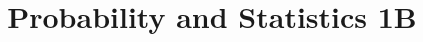 \documentclass[a4paper]{article}
\title{Probability and Statistics 1B}
\begin{document}
    \maketitle
    \pagebreak

    \tableofcontents
    \pagebreak

    
    
    
    
    
    
    
    
    
    
\end{document}
